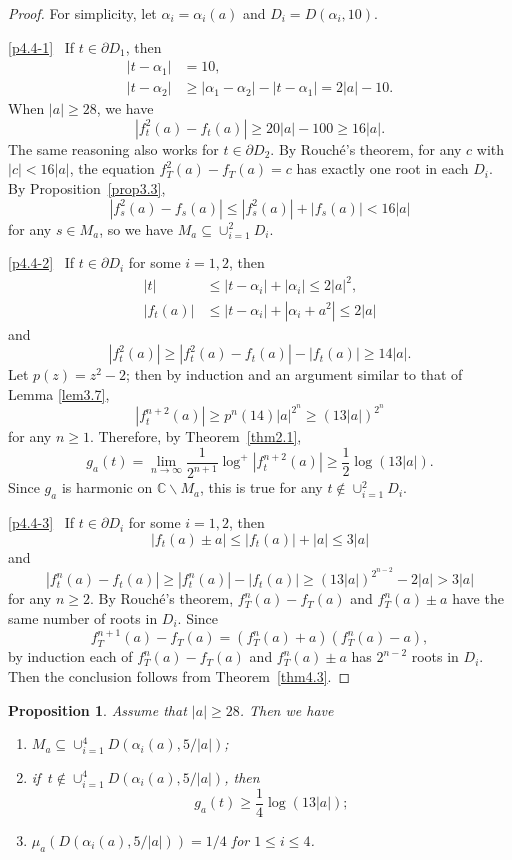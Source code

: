 \documentclass[11pt]{amsart}
\numberwithin{equation}{section}
\theoremstyle{plain}
\newtheorem{prop}[thm]{Proposition}
\theoremstyle{definition}
\theoremstyle{remark}
\newcommand{\C}{\mathbb C}
\begin{document}
\begin{proof}
  For simplicity, let $\alpha_{i}=\alpha_{i}(a)$ and $D_{i}=D(\alpha_{i},10)$.

\eqref{p4.4-1}~ If $t\in\partial D_{1}$, then
\begin{align*}
|t-\alpha_{1}| & =10,\\
|t-\alpha_{2}| & \geq|\alpha_{1}-\alpha_{2}|-|t-\alpha_{1}|=2|a|-10.
\end{align*}
When $|a|\geq28$, we have
\[
|f_{t}^{2}(a)-f_{t}(a)|\geq20|a|-100\geq16|a|.
\]
The same reasoning also works for $t\in\partial D_{2}$. By Rouch\'e's
theorem, for any $c$ with $|c|<16|a|$, the equation $f_{T}^{2}(a)-f_{T}(a)=c$
has exactly one root in each $D_{i}$. By Proposition~\ref{prop3.3},
\[
\left|f_{s}^{2}(a)-f_{s}(a)\right|\leq\left|f_{s}^{2}(a)\right|+|f_{s}(a)|<16|a|
\]
for any $s\in M_{a}$, so we have $M_{a}\subseteq\cup_{i=1}^{2}D_{i}$.

\eqref{p4.4-2}~ If $t\in\partial D_{i}$ for some $i=1,2$, then
\begin{align*}
|t| & \leq|t-\alpha_{i}|+|\alpha_{i}|\leq2|a|^{2},\\
|f_{t}(a)| & \leq|t-\alpha_{i}|+|\alpha_{i}+a^{2}|\leq2|a|
\end{align*}
and
\[
\left|f_{t}^{2}(a)\right|\geq\left|f_{t}^{2}(a)-f_{t}(a)\right|-|f_{t}(a)|\geq14|a|.
\]
Let $p(z)=z^{2}-2$; then by induction and an argument similar to that of Lemma
\ref{lem3.7},
\[
\left|f_{t}^{n+2}(a)\right|\geq p^{n}(14)|a|^{2^{n}}\geq(13|a|)^{2^{n}}
\]
for any $n\geq1$. Therefore, by Theorem~\ref{thm2.1},
\[
g_{a}(t)=\lim_{n\to\infty}\frac{1}{2^{n+1}}\log^{+}\left|f_{t}^{n+2}(a)\right|\geq\frac{1}{2}\log(13|a|).
\]
Since $g_{a}$ is harmonic on $\C\backslash M_{a}$, this
is true for any $t\notin\cup_{i=1}^{2}D_{i}$.

\eqref{p4.4-3}~  If $t\in\partial D_{i}$ for some $i=1,2$, then
\[
|f_{t}(a)\pm a|\leq|f_{t}(a)|+|a|\leq3|a|
\]
and
\[
\left|f_{t}^{n}(a)-f_{t}(a)\right|\geq\left|f_{t}^{n}(a)\right|-|f_{t}(a)|\geq(13|a|)^{2^{n-2}}-2|a|>3|a|
\]
for any $n\geq2$. By Rouch\'e's theorem, $f_{T}^{n}(a)-f_{T}(a)$
and $f_{T}^{n}(a)\pm a$ have the same number of roots in $D_{i}$.
Since
\[
f_{T}^{n+1}(a)-f_{T}(a)=\left(f_{T}^{n}(a)+a\right)\left(f_{T}^{n}(a)-a\right),
\]
by induction each of $f_{T}^{n}(a)-f_{T}(a)$ and $f_{T}^{n}(a)\pm a$
has $2^{n-2}$ roots in $D_{i}$. Then the conclusion follows from
Theorem~\ref{thm4.3}.
\end{proof}

\begin{prop}\label{prop4.5}
Assume that $|a|\geq28$. Then we have
\begin{enumerate}
\item $M_{a}\subseteq\cup_{i=1}^{4}D(\alpha_{i}(a),5/|a|)$;
\item if\, $t\notin\cup_{i=1}^{4}D(\alpha_{i}(a),5/|a|)$, then
\[
g_{a}(t)\geq\frac{1}{4}\log(13|a|); 
\]
\item $\mu_{a}(D(\alpha_{i}(a),5/|a|))=1/4$ for $1\leq i\leq4$.
\end{enumerate}
\end{prop}
\end{document}
